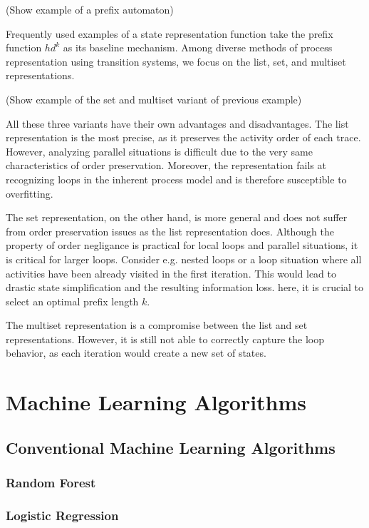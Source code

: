 (Show example of a prefix automaton)

Frequently used examples of a state representation function take the prefix function $hd^k$ as its baseline mechanism. Among diverse methods of process representation using transition systems, we focus on the list, set, and multiset representations.

(Show example of the set and multiset variant of previous example)

All these three variants have their own advantages and disadvantages. The list representation is the most precise, as it preserves the activity order of each trace. However, analyzing parallel situations is difficult due to the very same characteristics of order preservation. Moreover, the representation fails at recognizing loops in the inherent process model and is therefore susceptible to overfitting.

The set representation, on the other hand, is more general and does not suffer from order preservation issues as the list representation does. Although the property of order negligance is practical for local loops and parallel situations, it is critical for larger loops. Consider e.g. nested loops or a loop situation where all activities have been already visited in the first iteration. This would lead to drastic state simplification and the resulting information loss. here, it is crucial to select an optimal prefix length $k$.
 
The multiset representation is a compromise between the list and set representations. However, it is still not able to correctly capture the loop behavior, as each iteration would create a new set of states.

\section{Machine Learning Algorithms}

\subsection{Conventional Machine Learning Algorithms}

\subsubsection*{Random Forest}
\subsubsection*{Logistic Regression}

